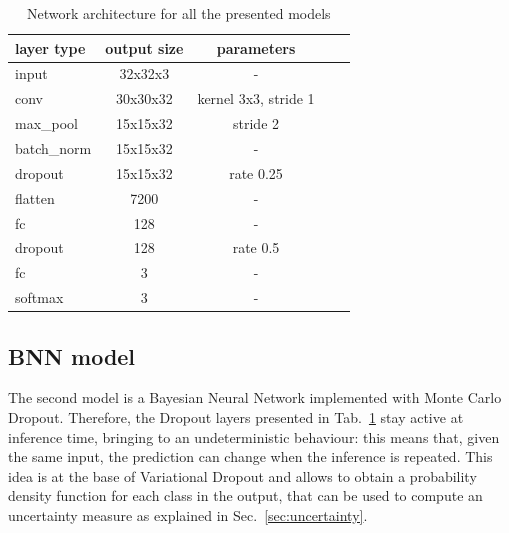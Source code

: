 \documentclass[11pt,twoside,a4paper]{article}
\begin{document}
\begin{table}[!h]
  \begin{adjustwidth}{-.5in}{-.5in}
  \begin{center}
    \begin{tabular}{l | c | c | c | c}
      layer type 	& output size	& parameters \\
      \hline
      input		& 32x32x3	& - \\
      conv		& 30x30x32 	& kernel 3x3, stride 1 \\
      max\_pool		& 15x15x32	& stride 2  \\
      batch\_norm 	& 15x15x32 	& - \\
      dropout		& 15x15x32	& rate 0.25 \\	
      flatten		& 7200		& - \\	
      fc		& 128		& - \\	
      dropout		& 128		& rate 0.5 \\
      fc		& 3		& - \\
      softmax		& 3		& - \\
    \end{tabular}
    \caption{Network architecture for all the presented models}
    \label{tab:arch}
  \end{center}
  \end{adjustwidth}
\end{table}


\subsection{BNN model}
\label{sec:bnn_model}
The second model is a Bayesian Neural Network implemented with Monte Carlo Dropout. Therefore, the Dropout layers presented in Tab.~\ref{tab:arch} stay active at inference time, bringing to an undeterministic behaviour: this means that, given the same input, the prediction can change when the inference is repeated. This idea is at the base of Variational Dropout and allows to obtain a probability density function for each class in the output, that can be used to compute an uncertainty measure as explained in Sec.~\ref{sec:uncertainty}.
\end{document}
